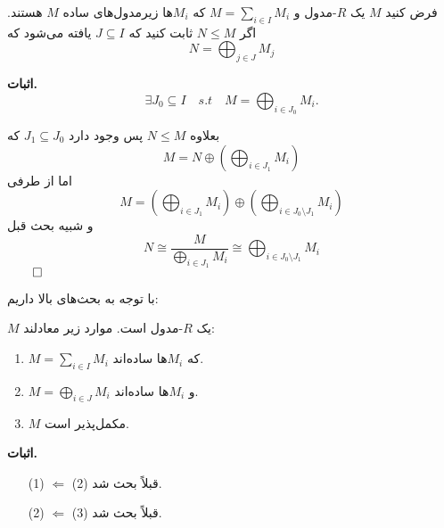 \begin{frame}
    \begin{theorem}
        فرض کنید \( M \) یک \( R \)-مدول و \( M = \sum_{i \in I} M_i \) که \( M_i \)ها زیرمدول‌های ساده \( M \) هستند. اگر
        \( N \leqslant M \)
        ثابت کنید که
        \(J \subseteq I\)
        یافته می‌شود که
        \[
            N = \bigoplus_{j \in J} M_j
        \]
    \end{theorem}
    \textbf{اثبات.}
    \[
        \exists J_0 \subseteq I \quad s.t \quad M = \bigoplus_{i \in J_0} M_i.
    \]


\end{frame}


\begin{frame}
    بعلاوه
    \( N \leqslant M \)
    پس وجود دارد
    \( J_1 \subseteq J_0 \)
    که
    \[
        M = N \oplus \left( \bigoplus_{i \in J_1} M_i \right)
    \]
    اما از طرفی
    \[
        M = \left( \bigoplus_{i \in J_1} M_i \right) \oplus \left( \bigoplus_{i \in J_0 \setminus J_1} M_i \right)
    \]
    و شبیه بحث قبل
    \[
        N \cong \frac{M}{\bigoplus_{i \in J_1} M_i} \cong \bigoplus_{i \in J_0 \setminus J_1} M_i
    \]
    \hfill 
    \(\qed\)
\end{frame}

\begin{frame}
    با توجه به بحث‌های بالا داریم:

    \begin{theorem}
        \( M \) یک \( R \)-مدول است. موارد زیر معادلند:
        \begin{enumerate}
            \item \( M = \sum_{i \in I} M_i \) که \( M_i \)ها ساده‌اند.
            \item \( M = \bigoplus_{i \in J} M_i \) و \( M_i \)ها ساده‌اند.
            \item \( M \) مکمل‌پذیر است.
        \end{enumerate}

    \end{theorem}
    \textbf{اثبات.}
    \begin{enumerate}
        \item [ (1) \(\Leftarrow\) (2)] قبلاً بحث شد.
        \item [ (2) \(\Leftarrow\) (3)] قبلاً بحث شد.


    \end{enumerate}



\end{frame}


